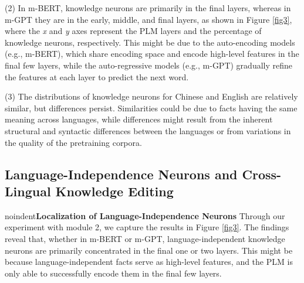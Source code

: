 \documentclass[]{article}
\newcommand{\vpara}[1]{noindent\textbf{#1 }}%
\begin{document}
(2) In m-BERT, knowledge neurons are primarily in the final layers, whereas in m-GPT they are in the early, middle, and final layers, as shown in Figure \ref{fig3}, where the \textit{x} and \textit{y} axes represent the PLM layers and the percentage of knowledge neurons, respectively. This might be due to the auto-encoding models (e.g., m-BERT), which share encoding space and encode high-level features in the final few layers, while the auto-regressive models (e.g., m-GPT) gradually refine the features at each layer to predict the next word.

(3) The distributions of knowledge neurons for Chinese and English are relatively similar, but differences persist. Similarities could be due to facts having the same meaning across languages, while differences might result from the inherent structural and syntactic differences between the languages or from variations in the quality of the pretraining corpora.
\begin{table}
\centering
{}
\caption{Results of the localization of knowledge neurons. B-KN is the baseline method, the symbol ``\textuparrow" indicates the increase in success rate compared to B-KN for our method, which can be expressed as: $\frac{{\text{AMIG}-\text{B-KN}}}{{\text{B-KN}}}$, and bold indicates the method with a higher $SR$.}
\label{table1}
\end{table}


\subsection{Language-Independence Neurons and Cross-Lingual Knowledge Editing}
\vpara{Localization of Language-Independence Neurons}
Through our experiment with module 2, we capture the results in Figure \ref{fig3}. The findings reveal that, whether in m-BERT or m-GPT, language-independent knowledge neurons are primarily concentrated in the final one or two layers.
This might be because language-independent facts serve as high-level features, and the PLM is only able to successfully encode them in the final few layers.
\end{document}

